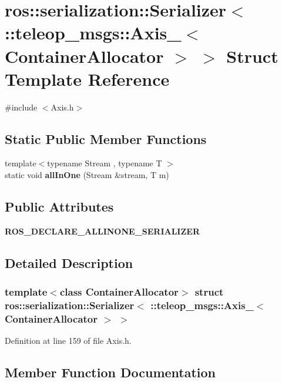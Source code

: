 \section{ros::serialization::Serializer$<$ ::teleop\_\-msgs::Axis\_\-$<$ ContainerAllocator $>$ $>$ Struct Template Reference}
\label{structros_1_1serialization_1_1Serializer_3_01_1_1teleop__msgs_1_1Axis___3_01ContainerAllocator_01_4_01_4}


{\ttfamily \#include $<$Axis.h$>$}

\subsection*{Static Public Member Functions}
\begin{DoxyCompactItemize}
\item 
{\footnotesize template$<$typename Stream , typename T $>$ }\\static void {\bf allInOne} (Stream \&stream, T m)
\end{DoxyCompactItemize}
\subsection*{Public Attributes}
\begin{DoxyCompactItemize}
\item 
{\bf ROS\_\-DECLARE\_\-ALLINONE\_\-SERIALIZER}
\end{DoxyCompactItemize}


\subsection{Detailed Description}
\subsubsection*{template$<$class ContainerAllocator$>$ struct ros::serialization::Serializer$<$ ::teleop\_\-msgs::Axis\_\-$<$ ContainerAllocator $>$ $>$}



Definition at line 159 of file Axis.h.



\subsection{Member Function Documentation}
